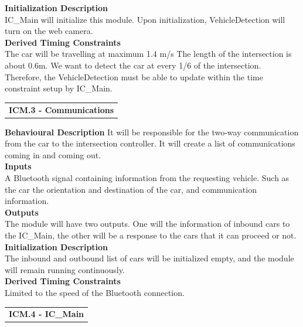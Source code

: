 \documentclass [10pt]{article}
\newcommand{\carSpeed}{1.4 m/s}
\newcommand{\intersectionLength}{0.6m}
\begin{document}
\textbf{Initialization Description} \\
IC\_Main will initialize this module. Upon initialization, VehicleDetection will turn on the web camera. \\

\textbf{Derived Timing Constraints} \\
The car will be travelling at maximum \carSpeed 
The length of the intersection is about \intersectionLength. 
We want to detect the car at every 1/6 of the intersection. Therefore, the VehicleDetection must be able to update within the time constraint setup by IC\_Main.
%





\begin{longtable}{p{}}
\rowcolor{tableCell}\textbf{ICM.3 - Communications} \\
\end{longtable}

\textbf{Behavioural Description} 
 It will be responsible for the two-way communication from the car to the intersection controller. It will create a list of communications coming in and coming out. \\

\textbf{Inputs} \\
  A Bluetooth signal containing information from the requesting vehicle. Such as the car the orientation and destination of the car, and communication information.\\

\textbf{Outputs} \\
    The module will have two outputs. One will the information of inbound cars to the IC\_Main, the other will be a response to the cars that it can proceed or not. \\

\textbf{Initialization Description} \\
    The inbound and outbound list of cars will be initialized empty, and the module will remain running continuously.\\


\textbf{Derived Timing Constraints}\\
    Limited to the speed of the Bluetooth connection.\\




\begin{longtable}{p{}}
\rowcolor{tableCell}\textbf{ICM.4 - IC\_Main} \\
\end{longtable}
\end{document}
